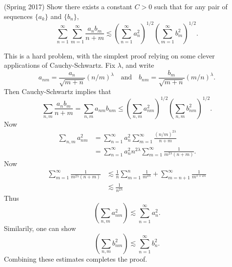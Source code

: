 \documentclass[answers]{exam}
\theoremstyle{problemstyle}
\newcommand{\1}[1]{\textbf{1}_{\left[#1\right]}} %
\begin{document}
\begin{questions}
\question (Spring 2017) Show there exists a constant $C > 0$ such that for any pair of sequences $\{ a_k \}$ and $\{ b_n \}$,
%
\[ \sum_{n = 1}^\infty \sum_{m = 1}^\infty \frac{a_n b_m}{n + m} \lesssim \left( \sum_{n = 1}^\infty a_n^2 \right)^{1/2} \left( \sum_{m = 1}^\infty b_m^2 \right)^{1/2}. \]
\begin{solution}
	This is a hard problem, with the simplest proof relying on some clever applications of Cauchy-Schwartz. Fix $\lambda$, and write
	\[ a_{nm} = \frac{a_n}{\sqrt{m + n}} (n/m)^\lambda \quad\text{and}\quad b_{nm} = \frac{b_m}{\sqrt{m + n}} (m/n)^\lambda. \]
	Then Cauchy-Schwartz implies that
	\[ \sum_{n,m} \frac{a_n b_m}{n + m} = \sum_{n,m} a_{nm} b_{nm} \leq \left( \sum_{n,m} a_{nm}^2 \right)^{1/2} \left( \sum_{n,m} b_{nm}^2 \right)^{1/2}. \]
	Now
	\begin{align*}
		\sum_{n,m} a_{nm}^2 &= \sum_{n = 1}^\infty a_n^2 \sum_{m = 1}^\infty \frac{(n/m)^{2\lambda}}{n + m}\\
		&= \sum_{n = 1}^\infty a_n^2 n^{2\lambda} \sum_{m = 1}^\infty \frac{1}{m^{2\lambda} (n + m)}. 
	\end{align*}
	Now
	\begin{align*}
		\sum_{m = 1}^\infty \frac{1}{m^{2\lambda} (n + m)} &\lesssim \frac{1}{n} \sum_{m = 1}^n \frac{1}{m^{2\lambda}} + \sum_{m = n+1}^\infty \frac{1}{m^{1 + 2\lambda}}\\
		&\lesssim \frac{1}{n^{2\lambda}}
	\end{align*}
	Thus
	\[ \left( \sum_{n,m} a_{nm}^2 \right) \lesssim \sum_{n = 1}^\infty a_n^2. \]
	Similarily, one can show
	\[ \left( \sum_{n,m} b_{nm}^2 \right) \lesssim \sum_{n = 1}^\infty b_n^2. \]
	Combining these estimates completes the proof.


\end{solution}
\end{questions}
\end{document}

